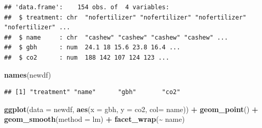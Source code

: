 \documentclass[
]{book}
\newenvironment{Shaded}{\begin{snugshade}}{\end{snugshade}}
\newcommand{\AttributeTok}[1]{\textcolor[rgb]{0.13,0.29,0.53}{#1}}
\newcommand{\CommentTok}[1]{\textcolor[rgb]{0.56,0.35,0.01}{\textit{#1}}}
\newcommand{\DecValTok}[1]{\textcolor[rgb]{0.00,0.00,0.81}{#1}}
\newcommand{\FloatTok}[1]{\textcolor[rgb]{0.00,0.00,0.81}{#1}}
\newcommand{\FunctionTok}[1]{\textcolor[rgb]{0.13,0.29,0.53}{\textbf{#1}}}
\newcommand{\NormalTok}[1]{#1}
\newcommand{\OtherTok}[1]{\textcolor[rgb]{0.56,0.35,0.01}{#1}}
\newcommand{\SpecialCharTok}[1]{\textcolor[rgb]{0.81,0.36,0.00}{\textbf{#1}}}
\newcommand{\StringTok}[1]{\textcolor[rgb]{0.31,0.60,0.02}{#1}}
\begin{document}
\begin{Shaded}
\end{Shaded}

\begin{verbatim}
## 'data.frame':    154 obs. of  4 variables:
##  $ treatment: chr  "nofertilizer" "nofertilizer" "nofertilizer" "nofertilizer" ...
##  $ name     : chr  "cashew" "cashew" "cashew" "cashew" ...
##  $ gbh      : num  24.1 18 15.6 23.8 16.4 ...
##  $ co2      : num  188 142 107 124 123 ...
\end{verbatim}

\begin{Shaded}
\begin{Highlighting}[]
\FunctionTok{names}\NormalTok{(newdf)}
\end{Highlighting}
\end{Shaded}

\begin{verbatim}
## [1] "treatment" "name"      "gbh"       "co2"
\end{verbatim}

\begin{Shaded}
\begin{Highlighting}[]
\FunctionTok{ggplot}\NormalTok{(}\AttributeTok{data =}\NormalTok{ newdf, }\FunctionTok{aes}\NormalTok{(}\AttributeTok{x =}\NormalTok{ gbh, }\AttributeTok{y =}\NormalTok{ co2, }\AttributeTok{col=}\NormalTok{ name)) }\SpecialCharTok{+}
  \FunctionTok{geom\_point}\NormalTok{() }\SpecialCharTok{+}
  \FunctionTok{geom\_smooth}\NormalTok{(}\AttributeTok{method =} \StringTok{\textquotesingle{}lm\textquotesingle{}}\NormalTok{) }\SpecialCharTok{+}
  \FunctionTok{facet\_wrap}\NormalTok{(}\SpecialCharTok{\textasciitilde{}}\NormalTok{ name)}
\end{Highlighting}
\end{Shaded}
\end{document}
